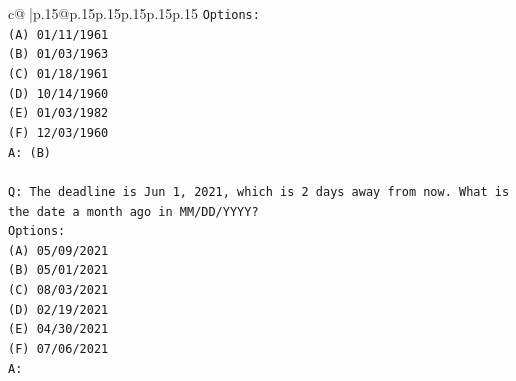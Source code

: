 \documentclass{article}
\begin{document}
{\begin{supertabular}{c@{$\;$}|p{.15\linewidth}@{}p{.15\linewidth}p{.15\linewidth}p{.15\linewidth}p{.15\linewidth}p{.15\linewidth}}
{{{\texttt{Options:} \\
\texttt{(A) 01/11/1961} \\
\texttt{(B) 01/03/1963} \\
\texttt{(C) 01/18/1961} \\
\texttt{(D) 10/14/1960} \\
\texttt{(E) 01/03/1982} \\
\texttt{(F) 12/03/1960} \\
\texttt{A: (B)} \\
\\ 
\texttt{Q: The deadline is Jun 1, 2021, which is 2 days away from now. What is the date a month ago in MM/DD/YYYY?} \\
\texttt{Options:} \\
\texttt{(A) 05/09/2021} \\
\texttt{(B) 05/01/2021} \\
\texttt{(C) 08/03/2021} \\
\texttt{(D) 02/19/2021} \\
\texttt{(E) 04/30/2021} \\
\texttt{(F) 07/06/2021} \\
\texttt{A:} \\
            }
        }
    }
     \\ \\


\end{supertabular}}
\end{document}
